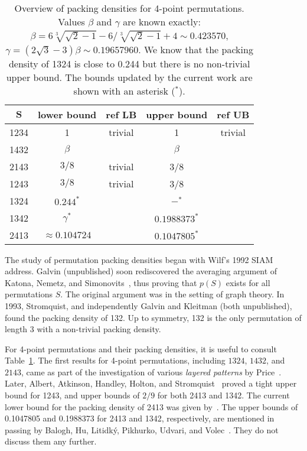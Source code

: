 \documentclass[12pt, a4paper, twoside]{report}
\begin{document}
\begin{table}[ht]
\centering
\begin{tabular}{|c | c | c | c | c|}
\hline
$\mathbf{S}$ & \textbf{lower bound} & \textbf{ref LB} & \textbf{upper bound} & \textbf{ref UB}\\
\hline\hline
1234 & 1 & trivial & 1 & trivial\\
\hline
1432 & $\beta$ & \cite{price1997packing} & $\beta$ & \cite{price1997packing}\\
\hline
2143 & $3/8$ & trivial & 3/8 & \cite{price1997packing}\\
\hline
1243 & $3/8$ & trivial & 3/8 & \cite{albert2002packing}\\
\hline
1324 & $0.244^*$ & \cite{price1997packing} & $ -^* $ & \cite{price1997packing}\\
\hline
1342 & $\gamma^*$ & \cite{batkeyev} & $0.1988373^*$ & \cite{balogh2015minimum}\\
\hline
2413 & $\approx 0.104724$ & \cite{presutti2010packing} & $0.1047805^*$ & \cite{balogh2015minimum}\\
\hline
\end{tabular}
\caption{\small{Overview of packing densities for 4-point permutations. Values $\beta$ and $\gamma$ are known exactly: $\beta = 6\sqrt[3]{\sqrt{2}-1}-6/\sqrt[3]{\sqrt{2}-1}+4 \sim 0.423570$, $\gamma = (2\sqrt{3}-3)\beta \sim 0.19657960$. We know that the packing density of 1324 is close to 0.244 but there is no non-trivial upper bound. The bounds updated by the current work are shown with an asterisk (${}^*$).}}
\label{tab:overview}
\end{table}

The study of permutation packing densities began with Wilf's 1992 SIAM address. Galvin (unpublished) soon rediscovered the averaging argument of Katona, Nemetz, and Simonovits~\cite{katona1964exists}, thus proving that $p(S)$ exists for all permutations $S$. The original argument was in the setting of graph theory. In 1993, Stromquist, and independently Galvin and Kleitman (both unpublished), found the packing density of 132. Up to symmetry, 132 is the only permutation of length 3 with a non-trivial packing density.

For 4-point permutations and their packing densities, it is useful to consult Table~\ref{tab:overview}. The first results for 4-point permutations, including $1324$, $1432$, and $2143$, came as part of the investigation of various \emph{layered patterns} by Price~\cite{price1997packing}. Later, Albert, Atkinson, Handley, Holton, and Stromquist~\cite{albert2002packing} proved a tight upper bound for 1243, and upper bounds of $2/9$ for both 2413 and 1342. The current lower bound for the packing density of 2413 was given by~\cite{presutti2010packing}. The upper bounds of 0.1047805 and 0.1988373 for 2413 and 1342, respectively, are mentioned in passing by Balogh, Hu, Litidk\'y, Pikhurko, Udvari, and Volec~\cite{balogh2015minimum}. They do not discuss them any further.
\end{document}
